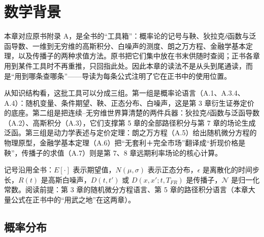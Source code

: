 \chapter{数学背景}

本章对应原书附录 A，是全书的“工具箱”：概率论的记号与鞅、狄拉克$\delta$函数与泛函导数、一维到无穷维的高斯积分、白噪声的测度、朗之万方程、金融学基本定理，以及传播子的两种求值方法。原书把它们集中放在书末供随时查阅；正书各章用到某件工具时不再重推，只回指此处。因此本章的读法不是从头到尾通读，而是“用到哪条查哪条”——导读为每条公式注明了它在正书中的使用位置。

从知识结构看，这批工具可以分成三组。第一组是概率论语言（A.1、A.3.4、A.4）：随机变量、条件期望、鞅、正态分布、白噪声，这是第 3 章衍生证券定价的底座。第二组是把连续--无穷维世界算清楚的两件兵器：狄拉克$\delta$函数与泛函导数（A.2）、高斯积分（A.3），它们支撑第 5 章的全部路径积分与第 7 章的场论生成泛函。第三组是动力学表述与定价定理：朗之万方程（A.5）给出随机微分方程的物理原型，金融学基本定理（A.6）把“无套利＋完全市场”翻译成“折现价格是鞅”，传播子的求值（A.7）则是第 7、8 章远期利率场论的核心计算。

记号沿用全书：$E[\cdot]$ 表示期望值，$N(\mu,\sigma)$ 表示正态分布，$\epsilon$ 是离散化的时间步长，$R(t)$ 是高斯白噪声，$D(t,t')$ 或 $D(x,x';t,T_{FR})$ 是传播子，$\mathcal{N}$ 是归一化常数。阅读前提：第 3 章的随机微分方程语言、第 5 章的路径积分语言（本章大量公式在正书中的“用武之地”在这两章）。

\section{概率分布}

